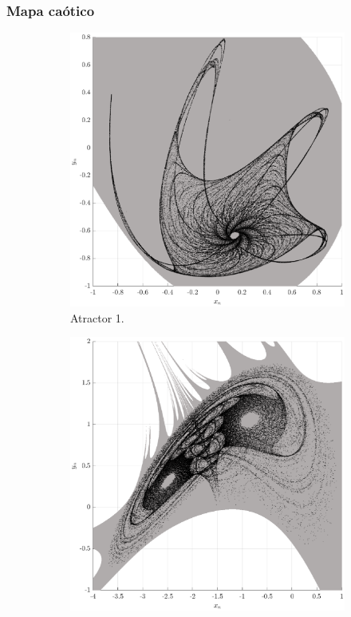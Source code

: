 \documentclass[10pt]{beamer}
\begin{document}
\begin{frame}
    \frametitle{Mapa caótico}
	\begin{figure}[hbtp]
            \centering
            \caption{Diferentes atractores caóticos y dominios de atracción del mapa bidimensional $A_{1}$ y $A_{2}$.} 
            \begin{subfigure}[b]{0.475\textwidth}
                \centering
                \includegraphics[width=\textwidth,trim=70 0 70 0,clip]{H1_map1}
                \caption{Atractor 1.}    
                \label{fig:mapa_h1}
            \end{subfigure}
            \hfill
            \begin{subfigure}[b]{0.475\textwidth}  
                \centering 
                \includegraphics[width=\textwidth,trim=70 0 70 0,clip]{H2_map2}

\end{subfigure}
\end{figure}
\end{frame}
\end{document}

